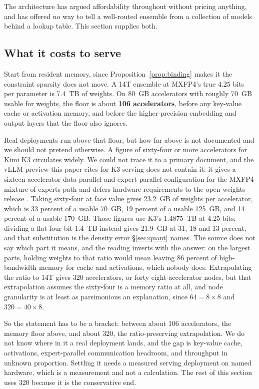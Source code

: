 \documentclass[11pt]{article}
\begin{document}
The architecture has argued affordability throughout without pricing anything, and has offered no way to tell a well-routed ensemble from a collection of models behind a lookup table. This section supplies both.

\subsection{What it costs to serve}

Start from resident memory, since Proposition~\ref{prop:binding} makes it the constraint sparsity does not move. A 14T ensemble at MXFP4's true 4.25 bits per parameter is 7.4~TB of weights. On 80~GB accelerators with roughly 70~GB usable for weights, the floor is about \textbf{106 accelerators}, before any key-value cache or activation memory, and before the higher-precision embedding and output layers that the floor also ignores.

Real deployments run above that floor, but how far above is not documented and we should not pretend otherwise. A figure of sixty-four or more accelerators for Kimi K3 circulates widely. We could not trace it to a primary document, and the vLLM preview this paper cites for K3 serving does not contain it: it gives a sixteen-accelerator data-parallel and expert-parallel configuration for the MXFP4 mixture-of-experts path and defers hardware requirements to the open-weights release \cite{vllm2026k3}. Taking sixty-four at face value gives 23.2~GB of weights per accelerator, which is 33 percent of a usable 70~GB, 19 percent of a usable 125~GB, and 14 percent of a usable 170~GB. Those figures use K3's 1.4875~TB at 4.25 bits; dividing a flat-four-bit 1.4~TB instead gives 21.9~GB at 31, 18 and 13 percent, and that substitution is the density error \S\ref{sec:quant} names. The source does not say which part it means, and the reading inverts with the answer: on the largest parts, holding weights to that ratio would mean leaving 86 percent of high-bandwidth memory for cache and activations, which nobody does. Extrapolating the ratio to 14T gives 320 accelerators, or forty eight-accelerator nodes, but that extrapolation assumes the sixty-four is a memory ratio at all, and node granularity is at least as parsimonious an explanation, since $64 = 8 \times 8$ and $320 = 40 \times 8$.

So the statement has to be a bracket: between about 106 accelerators, the memory floor above, and about 320, the ratio-preserving extrapolation. We do not know where in it a real deployment lands, and the gap is key-value cache, activations, expert-parallel communication headroom, and throughput in unknown proportion. Settling it needs a measured serving deployment on named hardware, which is a measurement and not a calculation. The rest of this section uses 320 because it is the conservative end.
\end{document}
